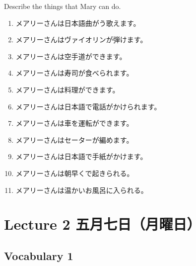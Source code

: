\documentclass[notoc,notitlepage]{tufte-book}
\begin{document}
\begin{ex}
  Describe the things that Mary can do.
  \begin{enumerate}
    \item メアリーさんは日本語曲がう歌えます。
    \item メアリーさんはヴァイオリンが弾けます。
    \item メアリーさんは空手道ができます。
    \item メアリーさんは寿司が食べられます。
    \item メアリーさんは料理ができます。
    \item メアリーさんは日本語で電話がかけられます。
    \item メアリーさんは車を運転ができます。
    \item メアリーさんはセーターが編めます。
    \item メアリーさんは日本語で手紙がかけます。
    \item メアリーさんは朝早くで起きられる。
    \item メアリーさんは温かいお風呂に入られる。
  \end{enumerate}
\end{ex}



\chapter{Lecture 2 五月七日（月曜日）}
  \label{chapter:lecture_2_may_07th_2018}

\section{Vocabulary 1}
\label{sect:vocabulary_1}

\end{document}
